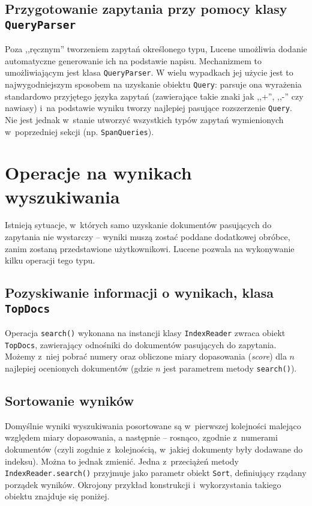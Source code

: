 \subsection{Przygotowanie zapytania przy pomocy klasy \texttt{QueryParser}}

Poza ,,ręcznym'' tworzeniem zapytań określonego typu, Lucene umożliwia dodanie automatyczne generowanie ich na podstawie napisu. Mechanizmem to umożliwiającym jest klasa \texttt{QueryParser}. W wielu wypadkach jej użycie jest to najwygodniejszym sposobem na uzyskanie obiektu \texttt{Query}: parsuje ona wyrażenia standardowo przyjętego języka zapytań (zawierające takie znaki jak ,,+'', ,,-'' czy nawiasy) i~na podstawie wyniku tworzy najlepiej pasujące rozszerzenie \texttt{Query}. Nie jest jednak w~stanie utworzyć wszystkich typów zapytań wymienionych w~poprzedniej sekcji (np. \texttt{SpanQueries}).

\section{Operacje na wynikach wyszukiwania}

Istnieją sytuacje, w~których samo uzyskanie dokumentów pasujących do zapytania nie wystarczy -- wyniki muszą zostać poddane dodatkowej obróbce, zanim zostaną przedstawione użytkownikowi. Lucene pozwala na wykonywanie kilku operacji tego typu.

\subsection{Pozyskiwanie informacji o wynikach, klasa \texttt{TopDocs}}

Operacja \texttt{search()} wykonana na instancji klasy \texttt{IndexReader} zwraca obiekt \texttt{TopDocs}, zawierający odnośniki do dokumentów pasujących do zapytania. Możemy z~niej pobrać numery oraz obliczone miary dopasowania (\emph{score}) dla $n$ najlepiej ocenionych dokumentów (gdzie $n$ jest parametrem metody \texttt{search()}).

\subsection{Sortowanie wyników}

Domyślnie wyniki wyszukiwania posortowane są w~pierwszej kolejności malejąco względem miary dopasowania, a następnie -- rosnąco, zgodnie z~numerami dokumentów (czyli zogdnie z~kolejnością, w~jakiej dokumenty były dodawane do indeksu). Można to jednak zmienić. Jedna z~przeciążeń metody \texttt{IndexReader.search()} przyjmuje jako parametr obiekt \texttt{Sort}, definiujący rządany porządek wyników. Okrojony przykład konstrukcji i~wykorzystania takiego obiektu znajduje się poniżej.

